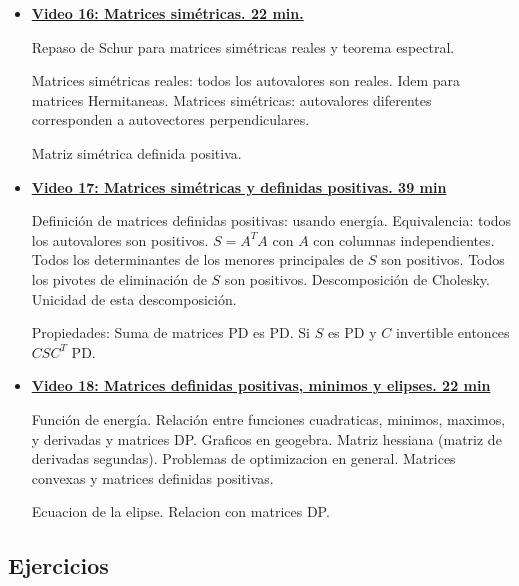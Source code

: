 \documentclass[12pt,a4paper]{article}
\newcommand\1{\mbox{\,\vrule height-0.8pt depth1.0pt width2pc\,}}
\newcommand\2{\mbox{\,\vrule height-0.8pt depth1.0pt width1pc\,}}
\begin{document}
\begin{itemize}
    \item \href{https://youtu.be/CMxZy8y8Fz8}{\bf Video 16: Matrices sim\'etricas. 22 min.}
    
    Repaso de Schur para matrices sim\'etricas reales y teorema espectral. 
    
    
    Matrices sim\'etricas reales: todos los autovalores son reales. Idem para matrices Hermitaneas.
    Matrices simétricas: autovalores diferentes corresponden a autovectores perpendiculares. 
    
    Matriz sim\'etrica definida positiva. 
    
    \item \href{https://youtu.be/sMO7EdDc3x8}{\bf Video 17: Matrices simétricas y definidas positivas. 39 min}
    
    Definici\'on de matrices definidas positivas: usando energ\'ia. Equivalencia: todos los autovalores son positivos. $S=A^TA$ con $A$ con columnas independientes. Todos los determinantes de los menores principales de $S$ son positivos. Todos los pivotes de eliminaci\'on de $S$ son positivos. Descomposici\'on de Cholesky. Unicidad de esta descomposici\'on.
    
   Propiedades: Suma de matrices PD es PD. Si $S$ es PD y $C$ invertible entonces $CSC^T$ PD. 
    
    
    \item \href{https://youtu.be/_uWEJ98xHTk}{\bf Video 18: Matrices definidas positivas, minimos y elipses. 22 min}
    
    Funci\'on de energ\'ia. Relaci\'on entre funciones cuadraticas, minimos, maximos, y derivadas y matrices DP. Graficos en geogebra. Matriz hessiana (matriz de derivadas segundas). Problemas de optimizacion en general. Matrices convexas y matrices definidas positivas.
    
    Ecuacion de la elipse. Relacion con matrices DP.
    
\end{itemize}

\subsection*{Ejercicios}
\end{document}
